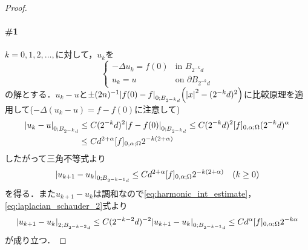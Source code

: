 \documentclass[a4paper]{ltjsarticle}
\newcommand{\Om}{\Omega}
\newcommand{\1}{\mathbbm{1}}
\numberwithin{equation}{section}
\theoremstyle{definition}
\begin{document}
\begin{proof}
    \paragraph*{\#1}$k=0,1,2,\ldots,$に対して，$u_k$を
    \begin{equation}
        \left\{
            \begin{array}{rl}
                -\Delta u_k = f(0) & \text{in $B_{2^{-k}d}$}\\
                u_k=u\quad\  & \text{on $\partial B_{2^{-k}d}$}
            \end{array}
        \right.
    \end{equation}
    の解とする．$u_k-u$と$\pm(2n)^{-1}\abs{f(0)-f}_{0;B_{2^{-k}d}}\qty(\abs{x}^2-(2^{-k}d)^2)$に比較原理を適用して($-\Delta(u_k-u)=f-f(0)$に注意して)
    \begin{equation}
        \begin{split}
            \abs{u_k-u}_{0;B_{2^{-k}d}}&\leq C(2^{-k}d)^2\abs{f-f(0)}_{0;B_{2^{-k}d}}\leq C(2^{-k}d)^2 [f]_{0,\alpha;\Om}(2^{-k}d)^{\alpha}\\
        &\leq Cd^{2+\alpha}[f]_{0,\alpha;\Om}2^{-k(2+\alpha)}
        \end{split}\label{eq:laplacian_schauder_1}
    \end{equation}
    したがって三角不等式より
    \begin{equation}
        \abs{u_{k+1}-u_k}_{0;B_{2^{-k-1}d}}\leq Cd^{2+\alpha}[f]_{0,\alpha;\Om}2^{-k(2+\alpha)}\quad (k\geq0 )\label{eq:laplacian_schauder_2}
    \end{equation}
    を得る．また$u_{k+1}-u_k$は調和なので\eqref{eq:harmonic_int_estimate}，\eqref{eq:laplacian_schauder_2}式より
    \begin{equation}
        \abs{u_{k+1}-u_k}_{2;B_{2^{-k-2}d}}\leq C(2^{-k-2}d)^{-2}\abs{u_{k+1}-u_k}_{0;B_{2^{-k-1}d}}\leq Cd^{\alpha}[f]_{0,\alpha;\Om}2^{-k\alpha} \label{eq:laplacian_schauder_3}
    \end{equation}
    が成り立つ．
    

\end{proof}
\end{document}
